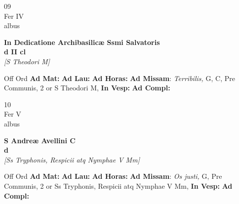 \documentclass[10pt, openany]{book}
\begin{document}
        \begin{center}
            \begin{minipage}{3.5in}
                \vspace{2em}
                \begin{minipage}{0.5in}
                    {\Huge 09} \\
                    {\normalsize Fer IV} \\
                    {\normalsize albus}
                \end{minipage}
                \begin{minipage}{3.0in}
                    \textbf{ \large In Dedicatione Archibasilicæ Ssmi Salvatoris \\
                    \textnormal{\normalsize d II cl}} \\ \textit{[S Theodori M]} \\ 
                \end{minipage}
                \begin{justify}Off Ord
                    \textbf{Ad Mat: }
                    \textbf{Ad Lau: }
                    \textbf{Ad Horas: }\textbf{Ad Missam}: \textit{Terribilis,} G, C, Pre Communis, 2 or S Theodori M,  
                    \textbf{In Vesp: }
                    \textbf{Ad Compl: }
                \end{justify}
            \end{minipage}
        \end{center}
    
        \begin{center}
            \begin{minipage}{3.5in}
                \vspace{2em}
                \begin{minipage}{0.5in}
                    {\Huge 10} \\
                    {\normalsize Fer V} \\
                    {\normalsize albus}
                \end{minipage}
                \begin{minipage}{3.0in}
                    \textbf{ \large S Andreæ Avellini C \\
                    \textnormal{\normalsize d}} \\ \textit{[Ss Tryphonis, Respicii atq Nymphae V Mm]} \\ 
                \end{minipage}
                \begin{justify}Off Ord
                    \textbf{Ad Mat: }
                    \textbf{Ad Lau: }
                    \textbf{Ad Horas: }\textbf{Ad Missam}: \textit{Os justi,} G, Pre Communis, 2 or Ss Tryphonis, Respicii atq Nymphae V Mm,  
                    \textbf{In Vesp: }
                    \textbf{Ad Compl: }
                \end{justify}
            \end{minipage}
        \end{center}
    
\end{document}
